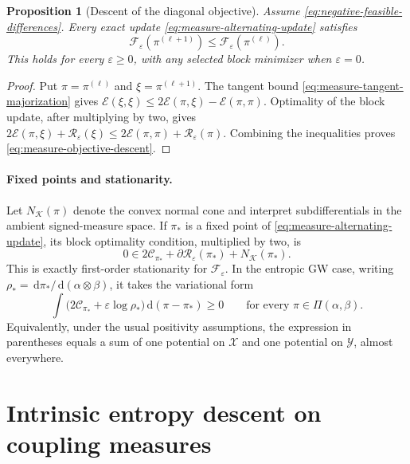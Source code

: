 \documentclass[11pt]{article}
\newtheorem{proposition}[theorem]{Proposition}
\theoremstyle{definition}
\theoremstyle{remark}
\newcommand{\Kcal}{\mathcal K}
\newcommand{\Ee}{\mathcal E}
\newcommand{\Fcal}{\mathcal F}
\newcommand{\Rcal}{\mathcal R}
\newcommand{\Ccal}{\mathcal C}
\newcommand{\dd}{\,\mathrm d}
\newcommand{\eps}{\varepsilon}
\begin{document}
\begin{proposition}[Descent of the diagonal objective]
\label{prop:measure-descent}
Assume \eqref{eq:negative-feasible-differences}.  Every exact update
\eqref{eq:measure-alternating-update} satisfies
\begin{equation}\label{eq:measure-objective-descent}
  \Fcal_\eps(\pi^{(\ell+1)})
  \leq
  \Fcal_\eps(\pi^{(\ell)}).
\end{equation}
This holds for every \(\eps\geq0\), with any selected block minimizer when
\(\eps=0\).
\end{proposition}

\begin{proof}
Put \(\pi=\pi^{(\ell)}\) and \(\xi=\pi^{(\ell+1)}\).  The tangent bound
\eqref{eq:measure-tangent-majorization} gives
\(
 \Ee(\xi,\xi)\leq2\Ee(\pi,\xi)-\Ee(\pi,\pi)
\).
Optimality of the block update, after multiplying by two, gives
\(
 2\Ee(\pi,\xi)+\Rcal_\eps(\xi)
 \leq
 2\Ee(\pi,\pi)+\Rcal_\eps(\pi)
\).
Combining the inequalities proves \eqref{eq:measure-objective-descent}.
\end{proof}

\paragraph{Fixed points and stationarity.}
Let \(N_{\Kcal}(\pi)\) denote the convex normal cone and interpret
subdifferentials in the ambient signed-measure space.  If \(\pi_*\) is a
fixed point of \eqref{eq:measure-alternating-update}, its block optimality
condition, multiplied by two, is
\begin{equation}\label{eq:measure-stationarity}
  0
  \in
  2\Ccal_{\pi_*}
  +\partial\Rcal_\eps(\pi_*)
  +N_{\Kcal}(\pi_*).
\end{equation}
This is exactly first-order stationarity for \(\Fcal_\eps\).  In the
entropic GW case, writing
\(
 \rho_*=\dd\pi_*/\dd(\alpha\otimes\beta)
\), it takes the variational form
\begin{equation}\label{eq:entropic-gw-variational-stationarity}
  \int
  \bigl(2\Ccal_{\pi_*}+\eps\log\rho_*\bigr)
  \dd(\pi-\pi_*)
  \geq0
  \qquad
  \text{for every }\pi\in\Pi(\alpha,\beta).
\end{equation}
Equivalently, under the usual positivity assumptions, the expression in
parentheses equals a sum of one potential on \(\mathcal X\) and one potential
on \(\mathcal Y\), almost everywhere.

\section{Intrinsic entropy descent on coupling measures}
\label{sec:convergence}
\end{document}
